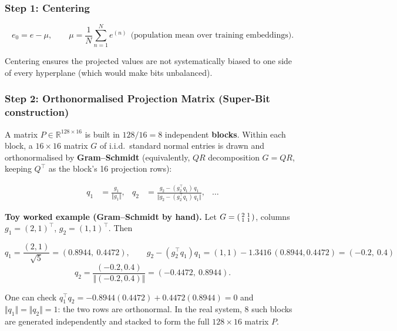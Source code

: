 \documentclass[11pt]{article}
\begin{document}
\subsubsection{Step 1: Centering}

\begin{equation}
e_0 = e - \mu, \qquad \mu = \frac{1}{N}\sum_{n=1}^{N} e^{(n)} \ \ \text{(population mean over training embeddings)}.
\end{equation}

Centering ensures the projected values are not systematically biased to one side of every
hyperplane (which would make bits unbalanced).

\subsubsection{Step 2: Orthonormalised Projection Matrix (Super-Bit construction)}

A matrix $P \in \mathbb{R}^{128\times16}$ is built in $128/16 = 8$ independent
\textbf{blocks}. Within each block, a $16\times16$ matrix $G$ of i.i.d.\ standard normal
entries is drawn and orthonormalised by \textbf{Gram--Schmidt} (equivalently, $QR$
decomposition $G = QR$, keeping $Q^{\!\top}$ as the block's 16 projection rows):

\begin{align}
q_1 &= \frac{g_1}{\Vert g_1 \Vert}, &
q_2 &= \frac{g_2 - (g_2^{\!\top}q_1)\,q_1}{\big\Vert g_2 - (g_2^{\!\top}q_1)\,q_1 \big\Vert}, & \ldots
\end{align}

\textbf{Toy worked example (Gram--Schmidt by hand).} Let
$G = \begin{psmallmatrix}2 & 1\\ 1 & 1\end{psmallmatrix}$, columns $g_1=(2,1)^{\!\top}$,
$g_2=(1,1)^{\!\top}$. Then

\begin{equation}
q_1 = \frac{(2,1)}{\sqrt{5}} = (0.8944,\ 0.4472), \qquad
g_2 - (g_2^{\!\top}q_1)q_1 = (1,1) - 1.3416\,(0.8944,0.4472) = (-0.2,\ 0.4)
\end{equation}
\begin{equation}
q_2 = \frac{(-0.2,0.4)}{\Vert(-0.2,0.4)\Vert} = (-0.4472,\ 0.8944).
\end{equation}

One can check $q_1^{\!\top}q_2 = -0.8944(0.4472)+0.4472(0.8944) = 0$ and $\Vert q_1\Vert =
\Vert q_2\Vert = 1$: the two rows are orthonormal. In the real system, 8 such blocks are
generated independently and stacked to form the full $128\times16$ matrix $P$.
\end{document}
